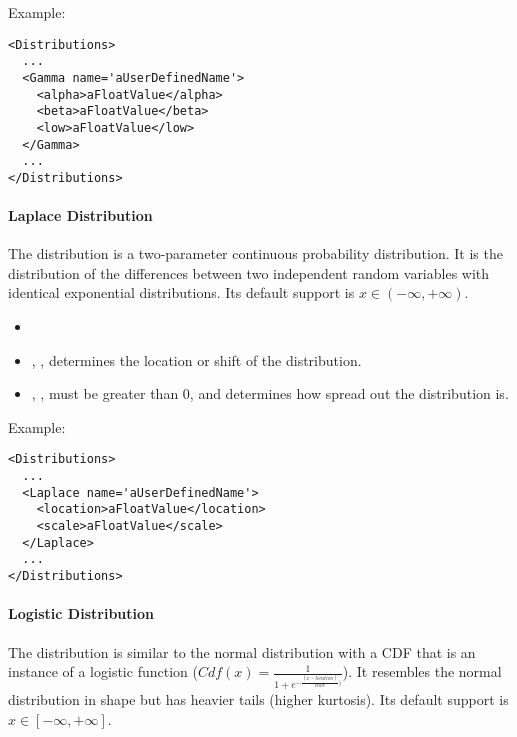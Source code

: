 Example:
\begin{lstlisting}[style=XML]
<Distributions>
  ...
  <Gamma name='aUserDefinedName'>
    <alpha>aFloatValue</alpha>
    <beta>aFloatValue</beta>
    <low>aFloatValue</low>
  </Gamma>
  ...
</Distributions>
\end{lstlisting}

\paragraph{Laplace Distribution}
\label{Laplace}
The  distribution is a two-parameter continuous
probability distribution.  It is the distribution of the differences
between two independent random variables with identical exponential
distributions.
%
Its default support is $x \in (-\infty,+\infty)$.

%
\attrIntro
\vspace{-5mm}
\begin{itemize}
  \itemsep0em
  \item \nameDescription
\end{itemize}
\vspace{-5mm}
\subnodesIntro
\begin{itemize}
\item {}, ,
  determines the location or shift of the distribution.
\item {}, , must be
  greater than 0, and determines how spread out the distribution is.
\end{itemize}

Example:
\begin{lstlisting}[style=XML]
<Distributions>
  ...
  <Laplace name='aUserDefinedName'>
    <location>aFloatValue</location>
    <scale>aFloatValue</scale>
  </Laplace>
  ...
</Distributions>
\end{lstlisting}

\paragraph{Logistic Distribution}
\label{Logistic}
The  distribution is similar to the
normal distribution with a CDF that is an instance of a logistic function ($Cdf(x) = \frac{1}{1+e^{-\frac{(x-location)}{scale})}}$).
%
It resembles the normal distribution in shape but has heavier tails (higher
kurtosis).
%
Its default support is $x \in [-\infty,+\infty]$.

